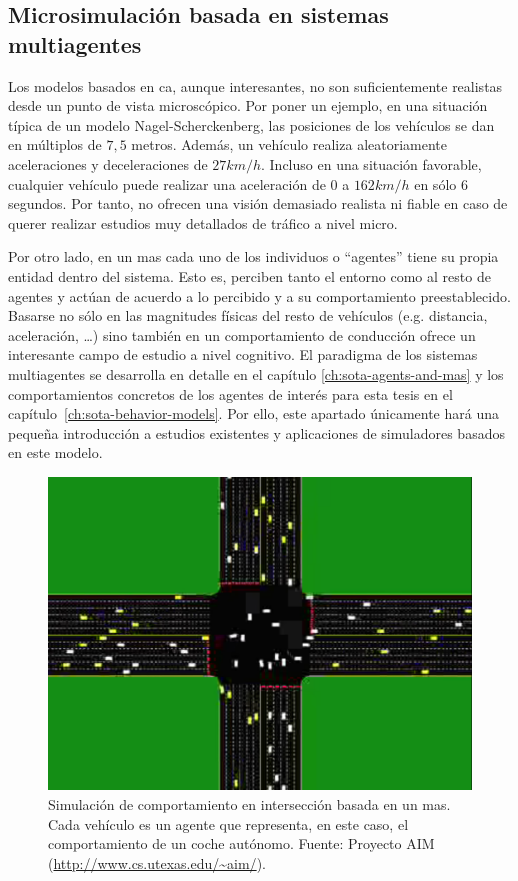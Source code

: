 \subsection{Microsimulación basada en sistemas multiagentes}

Los modelos basados en \ac{ca}, aunque interesantes, no son suficientemente realistas desde un punto de vista microscópico. Por poner un ejemplo, en una situación típica de un modelo Nagel-Scherckenberg, las posiciones de los vehículos se dan en múltiplos de $7,5$ metros. Además, un vehículo realiza aleatoriamente aceleraciones y deceleraciones de $27 km/h$. Incluso en una situación favorable, cualquier vehículo puede realizar una aceleración de $0$ a $162km/h$ en sólo $6$ segundos. Por tanto, no ofrecen una visión demasiado realista ni fiable en caso de querer realizar estudios muy detallados de tráfico a nivel micro.

Por otro lado, en un \ac{mas} cada uno de los individuos o \enquote{agentes} tiene su propia entidad dentro del sistema. Esto es, perciben tanto el entorno como al resto de agentes y actúan de acuerdo a lo percibido y a su comportamiento preestablecido. Basarse no sólo en las magnitudes físicas del resto de vehículos (e.g. distancia, aceleración, \ldots) sino también en un comportamiento de conducción ofrece un interesante campo de estudio a nivel cognitivo. El paradigma de los sistemas multiagentes se desarrolla en detalle en el capítulo \ref{ch:sota-agents-and-mas} y los comportamientos concretos de los agentes de interés para esta tesis en el capítulo~\ref{ch:sota-behavior-models}. Por ello, este apartado únicamente hará una pequeña introducción a estudios existentes y aplicaciones de simuladores basados en este modelo.

\begin{figure}
	\centering
	\includegraphics{images/autonomous-vehicles-at-intersections}
	\caption{Simulación de comportamiento en intersección basada en un \ac{mas}. Cada vehículo es un agente que representa, en este caso, el comportamiento de un coche autónomo. Fuente: Proyecto AIM (\url{http://www.cs.utexas.edu/~aim/}).}
	\label{fig:autonomous-vehicles-at-intersections}
\end{figure}


